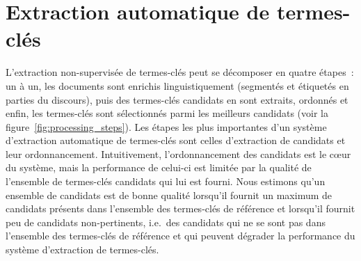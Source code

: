 \section{Extraction automatique de termes-clés}
\label{sec:extraction_automatique_de_termes_cles}
  L'extraction non-supervisée de termes-clés peut se décomposer en quatre
  étapes~: un à un, les documents sont enrichis linguistiquement (segmentés et
  étiquetés en parties du discours), puis des termes-clés candidats en sont
  extraits, ordonnés et enfin, les termes-clés sont sélectionnés parmi les
  meilleurs candidats (voir la figure~\ref{fig:processing_steps}). Les étapes
  les plus importantes d'un système d'extraction automatique de termes-clés sont
  celles d'extraction de candidats et leur ordonnancement. Intuitivement,
  l'ordonnancement des candidats est le c\oe{}ur du système, mais la performance
  de celui-ci est limitée par la qualité de l'ensemble de termes-clés candidats
  qui lui est fourni. Nous estimons qu'un ensemble de candidats est de bonne
  qualité lorsqu'il fournit un maximum de candidats présents dans l'ensemble des
  termes-clés de référence et lorsqu'il fournit peu de candidats non-pertinents,
  i.e.~des candidats qui ne se sont pas dans l'ensemble des termes-clés de
  référence et qui peuvent dégrader la performance du système d'extraction de
  termes-clés.
